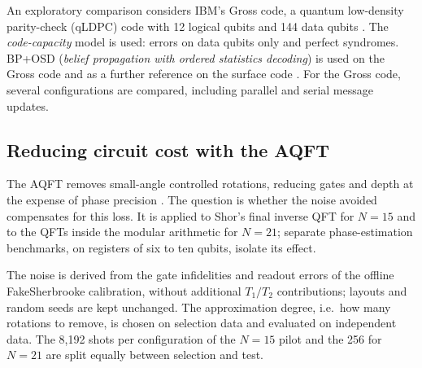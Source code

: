 An exploratory comparison considers IBM's Gross code, a quantum low-density parity-check
(qLDPC) code with 12 logical qubits and 144 data qubits \cite{en-bravyi2024}. The
\emph{code-capacity} model is used: errors on data qubits only and perfect syndromes.
BP+OSD (\emph{belief propagation with ordered statistics decoding}) is used on the Gross
code and as a further reference on the surface code \cite{en-roffe2020}. For the Gross
code, several configurations are compared, including parallel and serial message updates.

\subsection{Reducing circuit cost with the AQFT}

The AQFT removes small-angle controlled rotations, reducing gates and depth at the expense
of phase precision \cite{en-barencoAQFT1996}. The question is whether the noise avoided
compensates for this loss. It is applied to Shor's final inverse QFT for \(N = 15\) and to
the QFTs inside the modular arithmetic for \(N = 21\); separate phase-estimation
benchmarks, on registers of six to ten qubits, isolate its effect.

The noise is derived from the gate infidelities and readout errors of the offline
FakeSherbrooke calibration, without additional \(T_1/T_2\) contributions; layouts and
random seeds are kept unchanged. The approximation degree, i.e.\ how many rotations to
remove, is chosen on selection data and evaluated on independent data. The 8,192 shots per
configuration of the \(N = 15\) pilot and the 256 for \(N = 21\) are split equally between
selection and test.
